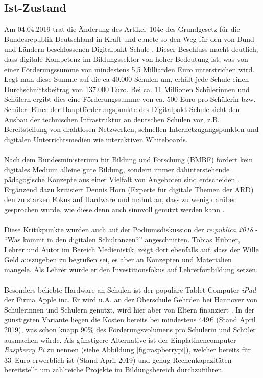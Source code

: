 \subsection{Ist-Zustand}\label{sec:problemstellung}
Am 04.04.2019 trat die Änderung des Artikel~104c des Grundgesetz für die Bundesrepublik Deutschland in Kraft
und ebnete so den Weg für den von Bund und Ländern beschlossenen Digitalpakt Schule \cite{Art104cG55:online}. 
Dieser Beschluss macht deutlich, dass digitale Kompetenz im Bildungssektor von hoher Bedeutung ist, was von einer Förderungssumme von mindestens 5,5 Milliarden Euro unterstrichen wird. 
Legt man diese Summe auf die ca 40.000 Schulen um, erhält jede Schule einen Durchschnittsbeitrag von 137.000 Euro. Bei ca. 11 Millionen Schülerinnen und Schülern ergibt dies eine Förderungssumme von ca. 500 Euro pro Schülerin bzw. Schüler. 
Einer der Hauptförderungspunkte des Digitalpakt Schule sieht den Ausbau der technischen Infrastruktur
an deutschen Schulen vor, z.B. Bereitstellung von drahtlosen Netzwerken, schnellen Internetzugangspunkten und digitalen Unterrichtsmedien wie interaktiven Whiteboards.
\\ \\
Nach dem Bundesministerium für Bildung und Forschung (BMBF) fördert kein digitales Medium alleine gute Bildung, sondern  immer dahinterstehende pädagogische Konzepte aus einer Vielfalt von Angeboten sind entscheiden \cite{dpakt2019:online}. Ergänzend dazu kritisiert Dennis Horn (Experte für digitale Themen der ARD) den zu starken Fokus auf Hardware und mahnt an, dass zu wenig darüber gesprochen wurde, wie diese denn auch sinnvoll genutzt werden kann \cite{Horn2018:online}. \\ \\
Diese Kritikpunkte wurden auch auf der Podiumsdiskussion der \emph{re:publica 2018} - "`Was kommt in den digitalen Schulranzen?"' angeschnitten. Tobias Hübner, Lehrer und Autor im Bereich Medienistik, zeigt dort ebenfalls auf, dass der Wille Geld auszugeben zu begrüßen sei, es aber an Konzepten und Materialien mangele. Als Lehrer würde er den Investitionsfokus auf Lehrerfortbildung setzen.
\\ \\
Besonders beliebte Hardware an Schulen ist der populäre Tablet Computer \textit{iPad} der Firma Apple inc.  Er wird u.A. an der Oberschule Gehrden bei Hannover von Schülerinnen und Schülern genutzt, wird hier aber von Eltern finanziert \cite{Hett2019}. In der günstigsten Variante liegen die Kosten bereits bei mindestens 449€ \cite{iPadmini65:online} (Stand April 2019), was schon knapp 90\% des Förderungsvolumens pro Schülerin und Schüler ausmachen würde. Als günstigere Alternative ist der Einplatinencomputer \emph{Raspberry Pi} zu nennen (siehe Abbildung \ref{fig:raspberrypi}), welcher bereits für 33~Euro erwerblich ist (Stand April 2019) und genug Rechenkapazitäten bereitstellt um zahlreiche Projekte im Bildungsbereich durchzuführen.


